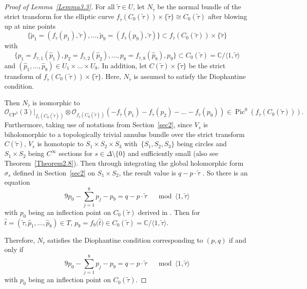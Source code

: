 \documentclass[pdftex]{sigma}
\numberwithin{equation}{section}
\begin{document}
\begin{proof}[Proof of Lemma~\ref{Lemma3.3}]
For all $\widetilde{\tau} \in U$, let $N_{\widetilde{\tau}}$ be the normal bundle of the strict transform for the elliptic curve $f_{\widetilde{\tau}}(C_0(\widetilde{\tau}))\times \{ \widetilde{\tau} \} \cong C_0(\widetilde{\tau})$ after blowing up at nine points
\[\{ \widetilde{p}_1=(f_{\widetilde{\tau}}(p_1),\widetilde{\tau}),\dots , \widetilde{p}_9=(f_{\widetilde{\tau}}(p_9),\widetilde{\tau}) \}\subset f_{\widetilde{\tau}}(C_0(\widetilde{\tau}))\times \{ \widetilde{\tau} \}\]
with
\[ \{ p_1=f_{\widetilde{\tau},1}(\hat{p}_1), p_2=f_{\widetilde{\tau},2}(\hat{p}_2),\dots ,p_8=f_{\widetilde{\tau},8}(\hat{p}_8),p_9 \}\subset C_0(\widetilde{\tau})=\mathbb{C}/ \langle 1,\widetilde{\tau} \rangle\]
and $(\hat{p}_1,\dots ,\hat{p}_8)\in $$U_1 \times \dots \times U_8$. In addition, let $C(\widetilde{\tau})\times \{ \widetilde{\tau} \}$ be the strict transform of $ f_{\widetilde{\tau}}(C_0(\widetilde{\tau}))\times \{ \widetilde{\tau} \}$. Here, $N_{\widetilde{\tau}}$ is assumed to satisfy the Diophantine condition.

Then $N_{\widetilde{\tau}}$ is isomorphic to
\[
\mathcal{O}_{\operatorname{CP}^2}(3)|_{f_{\widetilde{\tau}}(C_0(\widetilde{\tau}))}\otimes \mathcal{O}_{f_{\widetilde{\tau}}(C_0(\widetilde{\tau}))}(-f_{\widetilde{\tau}}(p_1)-f_{\widetilde{\tau}}(p_2)-\dots -f_{\widetilde{\tau}}(p_9))\in \operatorname{Pic}^0(f_{\widetilde{\tau}}(C_0(\widetilde{\tau}))).
\]
Furthermore, taking use of notations from Section~\ref{sec2}, since $V_s$ is biholomorphic to a topologically trivial annulus bundle over the strict transform $C(\widetilde{\tau})$, $V_s$ is homotopic to $ S_1 \times S_2 \times S_3$ with~$ { \{S_1 , S_2 , S_3 \}}$ being circles and $ S_1 \times S_2$ being $C^\infty$ sections for $s\in \Delta \setminus \{ 0\}$ and sufficiently small \cite{Takayuki-Takato2} (also see Theorem~\ref{Theorem2.8}). Then through integrating the global holomorphic form $\sigma_s$ defined in Section~\ref{sec2} on $ S_1 \times S_2$, the result value is $q-p \cdot \widetilde{\tau}$ \cite{Takayuki-Takato1}. So there is an equation
\[9p_0-\sum _{j=1}^8p_j-p_9=q-p\cdot \widetilde{\tau} \quad \mod \langle 1, \widetilde{\tau} \rangle \]
with $p_0$ being an inflection point on $C_0(\widetilde{\tau})$ derived in \cite{Takayuki-Takato2}. Then for $\hat{t}=(\widetilde{\tau},\hat{p}_1,\dots ,\hat{p}_8)\in T$, $p_9=f_9\bigl(\hat{t}\bigr)\in C_0(\widetilde{\tau})=\mathbb{C}/ \langle 1, \widetilde{\tau} \rangle$.

Therefore, $N_{\widetilde{\tau}}$ satisfies the Diophantine condition corresponding to $(p,q)$ if and only if
\[9p_0-\sum _{j=1}^8p_j-p_9=q-p\cdot \widetilde{\tau} \quad \mod \langle 1, \widetilde{\tau} \rangle \]
with $p_0$ being an inflection point on $C_0(\widetilde{\tau})$.


\end{proof}
\end{document}
